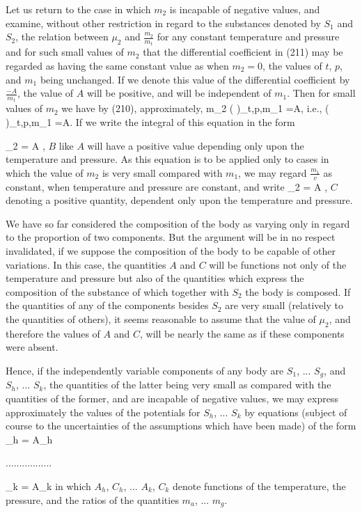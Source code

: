\documentclass[12pt]{memoir}
\begin{document}
Let us return to the case in which $m_2$ is incapable of negative values, and examine, without other restriction in regard to the substances denoted by $S_1$ and $S_2$, the relation between $\mu_2$ and $\frac{m_2}{m_1}$ for any constant temperature and pressure and for such small values of $m_2$ that the differential coefficient in (211) may be regarded as having the same constant value as when $m_2=0$, the values of $t$, $p$, and $m_1$ being unchanged. If we denote this value of the differential coefficient by
$\frac{-A}{m_1}$, the value of $A$ will be positive, and will be independent of $m_1$. Then for small values of $m_2$ we have by (210), approximately,
\eqs m_2 \left(  \right)_{t,p,m_1}   =A,  \label{213}\eqe
i.e.,
\eqs \left(  \right)_{t,p,m_1}   =A.  \label{214}\eqe
If we write the integral of this equation in the form

\eqs \mu_2 = A \log {},   \label{215}\eqe
$B$ like $A$ will have a positive value depending only upon the temperature and pressure. As this equation is to be applied only to cases in which the value of $m_2$ is very small compared with $m_1$, we may
regard $\frac{m_1}{v}$ as constant, when temperature and pressure are constant, and write
\eqs \mu_2 = A \log {},   \label{216}\eqe
$C$ denoting a positive quantity, dependent only upon the temperature and pressure.


We have so far considered the composition of the body as varying only in regard to the proportion of two components. But the argument will be in no respect invalidated, if we suppose the composition of the body to be capable of other variations. In this case, the quantities $A$ and $C$ will be functions not only of the temperature and pressure but also of the quantities which express the composition of the substance of which together with $S_2$ the body is composed. If the quantities of any of the components besides $S_2$ are very small (relatively to the quantities of others), it seems reasonable to assume that the value of $\mu_2$, and therefore the values of $A$ and $C$, will be nearly the same as if these components were absent.


Hence, if the independently variable components of any body are $S_1$, ... $S_g$, and $S_h$, ... $S_k$, the quantities of the latter being very small as compared with the quantities of the former, and are incapable of negative values, we may express approximately the values of the potentials for $S_h$, ... $S_k$ by equations (subject of course to the uncertainties of the assumptions which have been made) of the form
\eqs \mu_h = A_h \log {}    \label{217}\eqe
\begin{center}................. \end{center}
\eqs \mu_k = A_k \log {}  \label{218}\eqe
in which $A_h$, $C_h$, ... $A_k$, $C_k$ denote functions of the temperature, the pressure, and the ratios of the quantities $m_a$, ... $m_g$.
\end{document}

